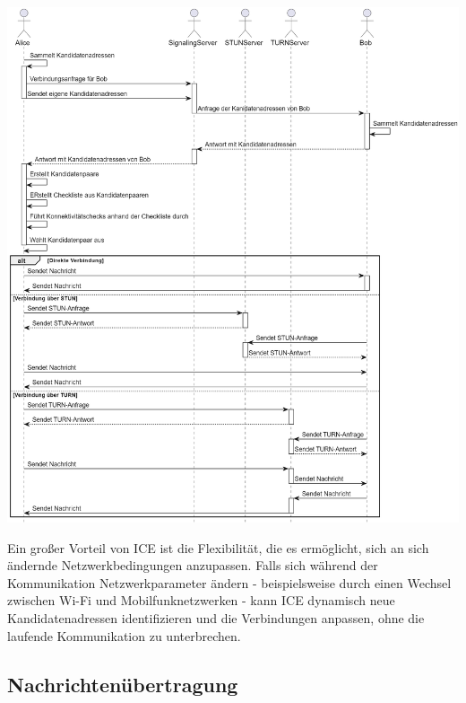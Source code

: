 \begin{center}
    \captionsetup{type=figure}
    \includegraphics[width=1.0\linewidth]{images/ice_sequence.png}
    \label{fig:ice_sequence}
\end{center}

\noindent Ein großer Vorteil von ICE ist die Flexibilität, die es ermöglicht, sich an sich ändernde Netzwerkbedingungen anzupassen. Falls sich während der Kommunikation Netzwerkparameter ändern - beispielsweise durch einen Wechsel zwischen Wi-Fi und Mobilfunknetzwerken - kann ICE dynamisch neue Kandidatenadressen identifizieren und die Verbindungen anpassen, ohne die laufende Kommunikation zu unterbrechen.

\subsection{Nachrichtenübertragung}

